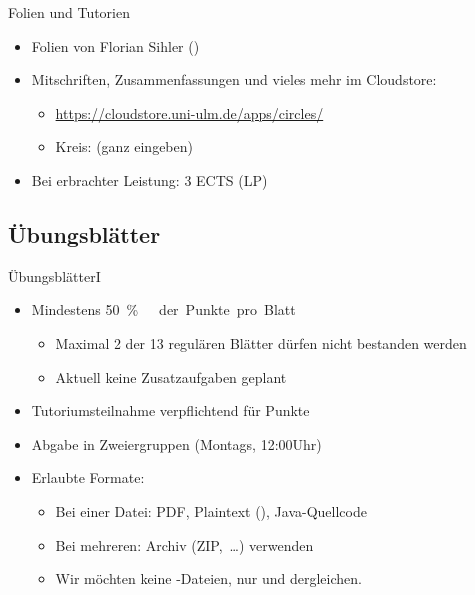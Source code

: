 \begin{frame}[t]{Folien und Tutorien}
    \begin{itemize}[<+(1)->]
        \itemsep=18pt
        \item Folien von Florian Sihler ()
        \item Mitschriften, Zusammenfassungen und vieles mehr im Cloudstore: \begin{itemize}[<1->]
            \item \url{https://cloudstore.uni-ulm.de/apps/circles/}
            \item Kreis:  (ganz eingeben)
        \end{itemize}
        \item Bei erbrachter Leistung: 3 ECTS (LP)
    \end{itemize}
\end{frame}


\savebox{}
\savebox{}
\subsection{Übungsblätter}
\begin{frame}[t]{Übungsblätter\hfill I}
\begin{itemize}[<+(1)->]
    \item Mindestens \qty{50}\percent\ der Punkte pro Blatt\begin{itemize}
        \itemsep=2.5pt
        \item Maximal 2 der 13 regulären Blätter dürfen nicht bestanden werden
        \item Aktuell keine Zusatzaufgaben geplant\vfill
    \end{itemize}
    \item Tutoriumsteilnahme verpflichtend für Punkte\vfill
    \item Abgabe in Zweiergruppen (Montags, 12:00\;Uhr) \par
    \vfill
    \item<7-> Erlaubte Formate: {\begin{itemize}
        \itemsep=2.5pt
        \item<8-> Bei einer Datei: PDF, Plaintext (), Java-Quellcode
        \item<9-> Bei mehreren: Archiv (ZIP,~\ldots) verwenden
        \item<10-> Wir möchten keine -Dateien, nur  und dergleichen.
    \end{itemize}}\vfill
\end{itemize}
\end{frame}


